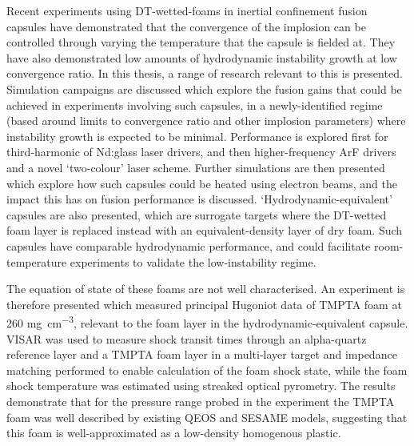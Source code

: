 Recent experiments using DT-wetted-foams in inertial confinement fusion capsules have demonstrated that the convergence of the implosion can be controlled through varying the temperature that the capsule is fielded at. They have also demonstrated low amounts of hydrodynamic instability growth at low convergence ratio. In this thesis, a range of research relevant to this is presented. Simulation campaigns are discussed which explore the fusion gains that could be achieved in experiments involving such capsules, in a newly-identified regime (based around limits to convergence ratio and other implosion parameters) where instability growth is expected to be minimal. Performance is explored first for third-harmonic of Nd:glass laser drivers, and then higher-frequency ArF drivers and a novel `two-colour' laser scheme. Further simulations are then presented which explore how such capsules could be heated using electron beams, and the impact this has on fusion performance is discussed. `Hydrodynamic-equivalent' capsules are also presented, which are surrogate targets where the DT-wetted foam layer is replaced instead with an equivalent-density layer of dry foam. Such capsules have comparable hydrodynamic performance, and could facilitate room-temperature experiments to validate the low-instability regime.

The equation of state of these foams are not well characterised. An experiment is therefore presented which measured principal Hugoniot data of TMPTA foam at 260 \unit{\milli\gram\per\centi\meter\cubed}, relevant to the foam layer in the hydrodynamic-equivalent capsule. VISAR was used to measure shock transit times through an alpha-quartz reference layer and a TMPTA foam layer in a multi-layer target and impedance matching performed to enable calculation of the foam shock state, while the foam shock temperature was estimated using streaked optical pyrometry. The results demonstrate that for the pressure range probed in the experiment the TMPTA foam was well described by existing QEOS and SESAME models, suggesting that this foam is well-approximated as a low-density homogenous plastic.